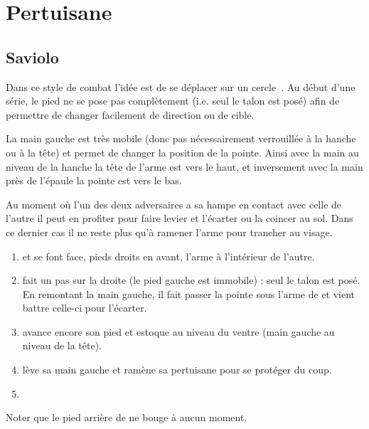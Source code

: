 \chapter{Pertuisane}


\section{Saviolo}


Dans ce style de combat l'idée est de se déplacer sur un cercle~\cite{livermore:cornucopia:partizan:2014}.
Au début d'une série, le pied ne se pose pas complètement (i.e. seul le talon est posé) afin de permettre de changer facilement de direction ou de cible.

La main gauche est très mobile (donc pas nécessairement verrouillée à la hanche ou à la tête) et permet de changer la position de la pointe. Ainsi avec la main au niveau de la hanche la tête de l'arme est vers le haut, et inversement avec la main près de l'épaule la pointe est vers le bas.

Au moment où l'un des deux adversaires a sa hampe en contact avec celle de l'autre il peut en profiter pour faire levier et l'écarter ou la coincer au sol. Dans ce dernier cas il ne reste plus qu'à ramener l'arme pour trancher au visage.


\begin{technique}

\begin{enumerate}
	\item \A et \D se font face, pieds droits en avant, l'arme à l'intérieur de l'autre.
	
	\item \A fait un pas sur la droite (le pied gauche est immobile) ; seul le talon est posé. En remontant la main gauche, il fait passer la pointe sous l'arme de \D et vient battre celle-ci pour l'écarter.
	
	\item \A avance encore son pied et estoque au niveau du ventre (main gauche au niveau de la tête).
	
	\item \D lève sa main gauche et ramène sa pertuisane pour se protéger du coup.
	
	\item {}
\end{enumerate}

Noter que le pied arrière de \A ne bouge à aucun moment.

\end{technique}


